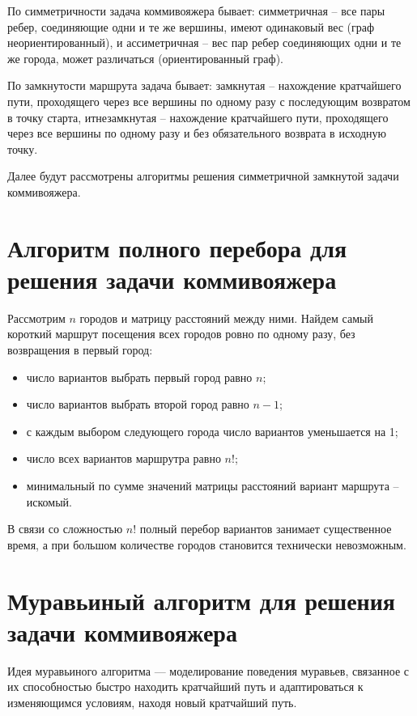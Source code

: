 По симметричности задача коммивояжера бывает: симметричная -- все пары ребер, соединяющие одни и те же вершины, имеют одинаковый вес (граф неориентированный), и ассиметричная -- вес пар ребер соединяющих одни и те же города, может различаться (ориентированный граф).

По замкнутости маршрута задача бывает: замкнутая -- нахождение кратчайшего пути, проходящего через все вершины по одному разу с последующим возвратом в точку старта, итнезамкнутая -- нахождение кратчайшего пути, проходящего через все вершины по одному разу и без обязательного возврата в исходную точку.

Далее будут рассмотрены алгоритмы решения симметричной замкнутой задачи коммивояжера.

\section{Алгоритм полного перебора для решения задачи коммивояжера}

Рассмотрим $n$ городов и матрицу расстояний между ними. Найдем самый короткий маршрут посещения всех городов ровно по одному разу, без возвращения в первый город:

\begin{itemize}
	\item число вариантов выбрать первый город равно $n$;
	\item число вариантов выбрать второй город равно $n - 1$;
	\item с каждым выбором следующего города число вариантов уменьшается на 1;
	\item число всех вариантов маршрутра равно $n!$;
	\item минимальный по сумме значений матрицы расстояний вариант маршрута -- искомый.
\end{itemize}

В связи со сложностью $n!$ полный перебор вариантов занимает существенное время, а при большом количестве городов становится технически невозможным.

\section{Муравьиный алгоритм для решения задачи коммивояжера}

Идея муравьиного алгоритма \cite{ant} — моделирование поведения муравьев, связанное с их способностью быстро находить кратчайший путь и адаптироваться к изменяющимся условиям, находя новый кратчайший путь.

